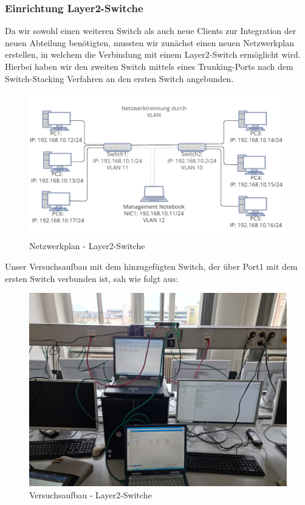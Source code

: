         \subsubsection{Einrichtung Layer2-Switche}
        Da wir sowohl einen weiteren Switch als auch neue Clients zur Integration der neuen Abteilung benötigten, 
        mussten wir zunächst einen neuen Netzwerkplan erstellen, in welchem die Verbindung mit einem Layer2-Switch ermöglicht wird.
        Hierbei haben wir den zweiten Switch mittels eines Trunking-Ports nach dem Switch-Stacking Verfahren an den ersten Switch angebunden.
        \begin{figure}[H]
            \centering
            \includegraphics[width=\linewidth]{images/Einrichtung Layer2-Switche/Netzwerkplan_VLAN_switch_stacking.png}
            \caption{Netzwerkplan - Layer2-Switche}
        \end{figure}
        Unser Versuchsaufbau mit dem hinzugefügten Switch, der über Port1 mit dem ersten Switch verbunden ist, sah wie folgt aus:
        \begin{figure}[H]
            \centering
            \includegraphics[width=0.6\linewidth]{images/Einrichtung Layer2-Switche/AufbauVersuch.jpg}
            \caption{Versuchsaufbau - Layer2-Switche}
        \end{figure}
